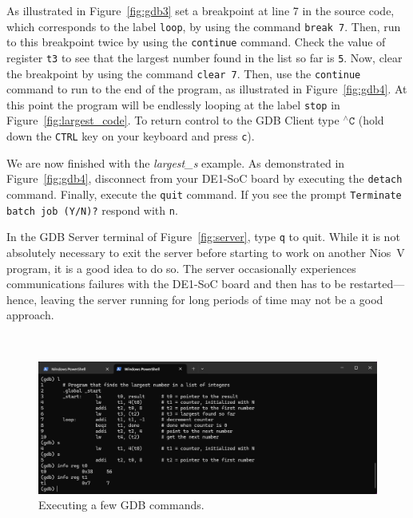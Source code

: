 \documentclass[11pt, twoside, pdftex]{article}
\begin{document}
{As illustrated in Figure~\ref{fig:gdb3} set a breakpoint at line 7 in the source code,
which corresponds to the label \texttt{loop}, by using the command \texttt{break 7}.
Then, run to this breakpoint twice by using the \texttt{continue}
command. Check the value of register \texttt{t3} to see that the largest number found in
the list so far is \texttt{5}. 
Now, clear the breakpoint by using the command \texttt{clear 7}. Then, use the
\texttt{continue} command to run to the end of the program, as illustrated in
Figure~\ref{fig:gdb4}.  At this point the program will
be endlessly looping at the label \texttt{stop} in Figure~\ref{fig:largest_code}. To
return control to the GDB Client type $^{\wedge}\texttt{C}$ (hold down the \texttt{CTRL} key 
on your keyboard and press \texttt{c}). 

We are now finished with the {\it largest\_s} example. As demonstrated in Figure~\ref{fig:gdb4},
disconnect from your DE1-SoC board by executing the \texttt{detach} command. Finally, execute
the \texttt{quit} command. If you see the prompt \texttt{Terminate batch job (Y/N)?}
respond with \texttt{n}.

In the GDB Server terminal of Figure~\ref{fig:server}, type \texttt{q} to quit. While
it is not absolutely necessary to exit the server before starting to work on another
Nios~V program, it is a good idea to do so. The server occasionally experiences
communications failures with the DE1-SoC board and then has to be restarted---hence, leaving 
the server running for long periods of time may not be a good approach.
        
~\\
\begin{figure}[h]
    \begin{center}
        \includegraphics[scale=.6]{figures/gdb2.png}
        \caption{Executing a few GDB commands.}
        \label{fig:gdb2}
    \end{center}
\end{figure}


}
\end{document}
